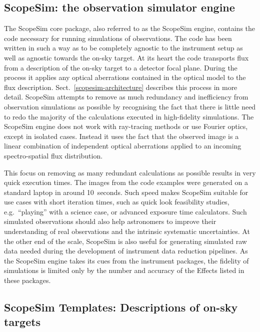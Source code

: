 \subsection{ScopeSim: the observation simulator engine}
\label{scopesim-the-observation-simulator-engine}

The ScopeSim core package, also referred to as the ScopeSim engine,
contains the code necessary for running simulations of observations.
The code has been written in such a way as to be completely agnostic
to the instrument setup as well as agnostic towards the on-sky target.
At its heart the code transports flux from a description of the on-sky
target to a detector focal plane.  During the process it applies any
optical aberrations contained in the optical model to the flux
description.  Sect.~\ref{scopesim-architecture} describes this process
in more detail.  ScopeSim attempts to remove as much redundancy and
inefficiency from observation simulations as possible by recognising
the fact that there is little need to redo the majority of the
calculations executed in high-fidelity simulations. The ScopeSim
engine does not work with ray-tracing methods or use Fourier optics,
except in isolated cases.  Instead it uses the fact that the observed
image is a linear combination of independent optical aberrations
applied to an incoming spectro-spatial flux distribution.

This focus on removing as many redundant calculations as possible
results in very quick execution times.  The images from the code
examples were generated on a standard laptop in around 10~seconds.
Such speed makes ScopeSim suitable for use cases with short iteration
times, such as quick look feasibility studies, e.g.~``playing'' with a
science case, or advanced exposure time calculators.  Such simulated
observations should also help astronomers to improve their
understanding of real observations and the intrinsic systematic
uncertainties.  At the other end of the scale, ScopeSim is also useful
for generating simulated raw data needed during the development of
instrument data reduction pipelines.  As the ScopeSim engine takes its
cues from the instrument packages, the fidelity of simulations is
limited only by the number and accuracy of the Effects listed in these
packages.


\subsection{ScopeSim Templates: Descriptions of on-sky targets}
\label{scopesim-templates-descriptions-of-on-sky-targets}

